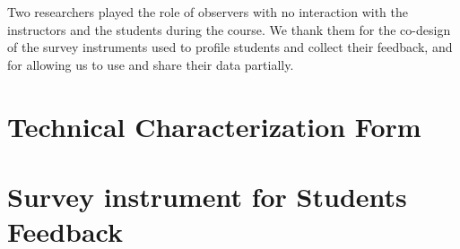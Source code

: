 \documentclass[sigconf]{acmart}
\begin{document}
\begin{acks}
Two researchers played the role of observers with no interaction with the instructors and the students during the course. We thank them for the co-design of the survey instruments used to profile students and collect their feedback, and for allowing us to use and share their data partially.
\end{acks}

\balance




\appendix

\section{Technical Characterization Form}
\label{app:reconhecimento-tecnico}


\section{Survey instrument for Students Feedback}
\label{app:questionario}

\end{document}
